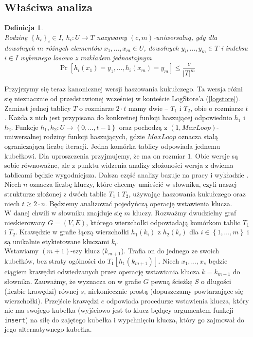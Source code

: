 \documentclass[declaration,shortabstract,masc]{iithesis}
\newtheorem{Def}{Definicja}
\newcommand{\bdf}{\begin{Def}~\\\normalfont\indent}
\newcommand{\edf}{\end{Def}\medskip}
\begin{document}
			\subsection{Właściwa analiza}
				\bdf
					Rodzinę $\left\{h_i\right\}_i\in I$, $h_i: U \to T$ nazywamy $\left(c, m\right)$-uniwersalną, gdy dla dowolnych $m$ różnych elementów $x_1,\ldots,x_m \in U$, dowolnych $y_i,\ldots,y_m \in T$ i indeksu $i \in I$ wybranego losowo z rozkładem jednostajnym
					$$\Pr[h_i(x_1) = y_1,\ldots,h_i(x_m) = y_m] \leq \frac{c}{|T|^m}$$
				\edf
				Przyjrzymy się teraz kanonicznej wersji haszowania kukułczego. Ta wersja różni się nieznacznie od przedstawionej wcześniej w konteście LogStore'a (\ref{logstore}). Zamiast jednej tablicy $T$ o rozmiarze $2 \cdot t$ mamy dwie -- $T_1$ i $T_2$, obie o rozmiarze $t$. Każda z nich jest przypisana do konkretnej funkcji haszującej odpowiednio $h_1$ i $h_2$. Funkcje $h_1, h_2 : U\to\left\{0,\ldots, t - 1\right\}$ oraz pochodzą z $(1, MaxLoop)$-uniwersalnej rodziny funkcji haszujących, gdzie $MaxLoop$ oznacza stałą ograniczającą liczbę iteracji. Jedna komórka tablicy odpowiada jednemu kubełkowi. Dla uproszczenia przyjmujemy, że ma on rozmiar $1$. Obie wersje są sobie równoważne, ale z punktu widzenia analizy złożoności wersja z dwiema tablicami będzie wygodniejsza. Dalsza część analizy bazuje na pracy \cite{CH} i wykładzie \cite{UW}.\\
				\indent Niech $n$ oznacza liczbę kluczy, które chcemy umieścić w słowniku, czyli naszej strukturze złożonej z dwóch tablic $T_1$ i $T_2$, używając haszowania kukułczego oraz niech $t\geq 2\cdot n$. Będziemy analizować pojedyńczą operację wstawienia klucza.\\
				\indent W danej chwili w słowniku znajduje się $m$ kluczy. Rozważmy dwudzielny graf nieskierowany $G=(V,E)$, którego wierzchołki odpowiadają komórkom tablic $T_1$ i $T_2$. Krawędzie w grafie łączą wierzchołki $h_1(k_i)$ z $h_2(k_i)$ dla $i \in \left\{1,\ldots,m\right\}$ i są unikalnie etykietowane kluczami $k_i$.\\
				\indent Wstawiamy $(m+1)$-szy klucz ($k_{m+1}$). Trafia on do jednego ze swoich kubełków, bez straty ogólności do $T_1[h_1(k_{m+1})]$. Niech $x_1,\ldots,x_s$ będzie ciągiem krawędzi odwiedzanych przez operację wstawiania klucza $k = k_{m+1}$ do słownika. Zauważmy, że wyznacza on w grafie $G$ pewną ścieżkę $S$ o długości (liczbie krawędzi) równej $s$, niekoniecznie prostą (dopuszczamy powtarzające się wierzchołki). Przejście krawędzi $e$ odpowiada procedurze wstawienia klucza, który nie ma swojego kubełka (wyjściowo jest to klucz będący argumentem funkcji \texttt{insert}) na siłę do zajętego kubełka i wypchnięciu klucza, który go zajmował do jego alternatywnego kubełka.
\end{document}
